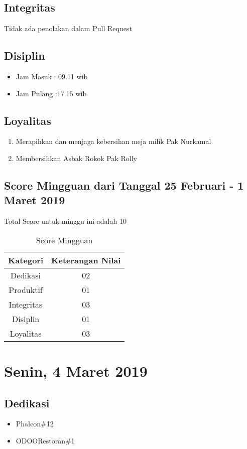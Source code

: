 \subsection{Integritas}
Tidak ada penolakan dalam Pull Request
\subsection{Disiplin}
\begin{itemize}
\item Jam Masuk : 09.11 wib
\item Jam Pulang :17.15 wib
\end{itemize}
\subsection{Loyalitas}
\begin{enumerate}
\item Merapihkan dan menjaga kebersihan meja milik Pak Nurkamal
\item Membersihkan Asbak Rokok Pak Rolly
\end{enumerate}

\subsection{Score Mingguan dari Tanggal 25 Februari - 1 Maret 2019}
Total Score untuk minggu ini adalah 10

\begin{table}[h]
\caption{Score Mingguan}
\centering
\begin{tabular}{|c|c|}
\hline
\textbf{Kategori}&\textbf{Keterangan Nilai}\\
\hline
Dedikasi&02\\
\hline
Produktif&01\\
\hline
Integritas&03\\
\hline
Disiplin&01\\
\hline
Loyalitas&03\\
\hline
\end{tabular}
\label{table:score mingguan}
\end{table}

\section{Senin, 4 Maret 2019}
\subsection{Dedikasi}
\begin{itemize}
\item Phalcon\#12
\item ODOORestoran\#1
\end{itemize}
